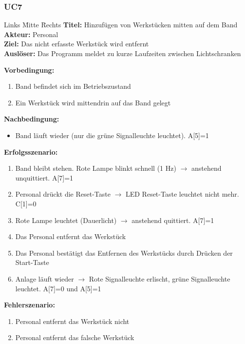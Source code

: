 \documentclass[oneside,a4paper,titlepage]{scrartcl}              %
\begin{document}
\newpage

\subsubsection{UC7}
\begin{tabbing}
  Links \= Mitte \= Rechts \kill
  \textbf{Titel:}    \> \> Hinzufügen von Werkstücken mitten auf dem Band\\
  \textbf{Akteur:}   \> \> Personal\\
  \textbf{Ziel:}     \> \> Das nicht erfasste Werkstück wird entfernt\\
  \textbf{Auslöser:} \> \> Das Programm meldet zu kurze Laufzeiten zwischen Lichtschranken\\
\end{tabbing}

\textbf{Vorbedingung:}
\begin{enumerate}
  \item Band befindet sich im Betriebszustand
  \item Ein Werkstück wird mittendrin auf das Band gelegt
\end{enumerate}

\textbf{Nachbedingung:}
\begin{itemize}
  \item Band läuft wieder (nur die grüne Signalleuchte leuchtet). A[5]=1
\end{itemize}

\textbf{Erfolgsszenario:}
\begin{enumerate}
  \item Band bleibt stehen. Rote Lampe blinkt schnell (1 Hz) $\rightarrow$ anstehend unquittiert. A[7]=1
  \item Personal drückt die Reset-Taste $\rightarrow$ LED Reset-Taste leuchtet nicht mehr. C[1]=0
  \item Rote Lampe leuchtet (Dauerlicht) $\rightarrow$ anstehend quittiert. A[7]=1
  \item Das Personal entfernt das Werkstück
  \item Das Personal bestätigt das Entfernen des Werkstücks durch Drücken der Start-Taste
  \item Anlage läuft wieder $\rightarrow$ Rote Signalleuchte erlischt, grüne Signalleuchte leuchtet. A[7]=0 und A[5]=1
\end{enumerate}

\textbf{Fehlerszenario:}
\begin{enumerate}
  \item Personal entfernt das Werkstück nicht
  \item Personal entfernt das falsche Werkstück
\end{enumerate}
\end{document}
